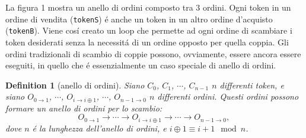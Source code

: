 \documentclass[UTF8,nofonts]{article}
\makeatletter
\newtheorem{definition}{Definition}[section]
\newenvironment{figurehere}
 {\def\@captype{figure}}
 {}
\makeatother
\begin{document}
\begin{multicols}{2}
\begin{center}
\begin{figurehere}

\caption{Un anello composto da 3 ordini}
\label{fig:ring}
\end{figurehere}
\end{center}


La figura 1 mostra un anello di ordini composto tra 3 ordini. Ogni token in un ordine di vendita (\verb|tokenS|) \'e anche un token in un altro ordine d'acquisto (\verb|tokenB|). Viene cos\'i creato un loop che permette ad ogni ordine di scambiare i token desiderati senza la necessit\'a di un ordine opposto per quella coppia. Gli ordini tradizionali di scambio di coppie possono, ovviamente, essere ancora essere eseguiti, in quello che \'e essenzialmente  un caso speciale di anello di ordini.


\begin{definition}[anello di ordini] Siano $C_{0}$, $C_{1}$, $\cdots$, $C_{n-1}$ $n$ differenti token, e siano $O_{0\rightarrow 1}$, $\cdots$, $O_{i\rightarrow i\oplus 1}$, $\cdots$, $O_{n-1 \rightarrow 0}$ $n$ differenti ordini. Questi ordini possono formare un anello di ordini per lo scambio:
$$O_{0\rightarrow 1} \rightarrow \cdots \rightarrow O_{i\rightarrow i\oplus 1} \rightarrow \cdots \rightarrow O_{n-1\rightarrow 0} \text{, }$$
dove $n$ \'e la lunghezza dell'anello di ordini, e $i\oplus 1 \equiv i+1 \mod n$.
\end{definition}


\end{multicols}
\end{document}
